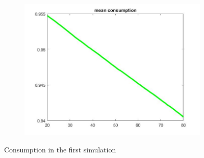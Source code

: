 \documentclass[12pt,a4paper]{article}
\begin{document}
\begin{figure}[h!]
\begin{subfigure}[b]{0.32\linewidth}
  \end{subfigure}
  \begin{subfigure}[b]{0.32\linewidth}
    \includegraphics[width=\linewidth]{graphs/Q2/mean_cons3.jpg}
  \end{subfigure}
  \caption{Consumption in the first simulation}
    \label{fig:1}
\end{figure}
\end{document}
